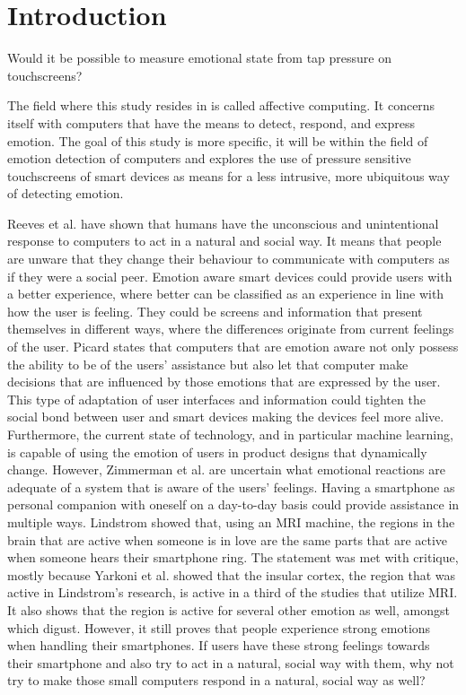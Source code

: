 \documentclass{sigchi}
\begin{document}
\section{Introduction} %
\label{sec:introduction}
Would it be possible to measure emotional state from tap pressure on touchscreens? 

The field where this study resides in is called affective computing. It concerns itself with computers that have the means to detect, respond, and express emotion. The goal of this study is more specific, it will be within the field of emotion detection of computers and explores the use of pressure sensitive touchscreens of smart devices as means for a less intrusive, more ubiquitous way of detecting emotion.

Reeves et al. \cite{Reeves1998} have shown that humans have the unconscious and unintentional response to computers to act in a natural and social way. It means that people are unware that they change their behaviour to communicate with computers as if they were a social peer. Emotion aware smart devices could provide users with a better experience, where better can be classified as an experience in line with how the user is feeling. They could be screens and information that present themselves in different ways, where the differences originate from current feelings of the user. Picard \cite{Picard1995} states that computers that are emotion aware not only possess the ability to be of the users' assistance but also let that computer make decisions that are influenced by those emotions that are expressed by the user. This type of adaptation of user interfaces and information could tighten the social bond between user and smart devices making the devices feel more alive. Furthermore, the current state of technology, and in particular machine learning, is capable of using the emotion of users in product designs that dynamically change. However, Zimmerman et al. \cite{Zimmermann2003} are uncertain what emotional reactions are adequate of a system that is aware of the users' feelings. Having a smartphone as personal companion with oneself on a day-to-day basis could provide assistance in multiple ways. Lindstrom \cite{Lindstrom2011} showed that, using an MRI machine, the regions in the brain that are active when someone is in love are the same parts that are active when someone hears their smartphone ring. The statement was met with critique, mostly because Yarkoni et al. \cite{Yarkoni2011} showed that the insular cortex, the region that was active in Lindstrom's research, is active in a third of the studies that utilize MRI. It also shows that the region is active for several other emotion as well, amongst which digust. However, it still proves that people experience strong emotions when handling their smartphones. If users have these strong feelings towards their smartphone and also try to act in a natural, social way with them, why not try to make those small computers respond in a natural, social way as well? 
\end{document}
